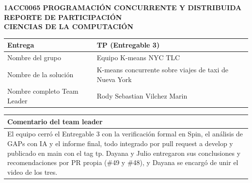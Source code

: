 \documentclass[11pt,a4paper]{article}
\newcommand{\nombreGrupo}{Equipo K-means NYC TLC}
\begin{document}
\begin{center}
\textbf{1ACC0065 PROGRAMACIÓN CONCURRENTE Y DISTRIBUIDA}\\[3pt]
\textbf{REPORTE DE PARTICIPACIÓN}\\[3pt]
\textbf{CIENCIAS DE LA COMPUTACIÓN}
\end{center}

\begin{tabularx}{\textwidth}{|L{5cm}|Y|}\hline
Entrega & TP (Entregable 3) \\\hline
Nombre del grupo & \nombreGrupo \\\hline
Nombre de la solución & K-means concurrente sobre viajes de taxi de Nueva York \\\hline
Nombre completo Team Leader & Rody Sebastian Vilchez Marin \\\hline
\end{tabularx}

\vspace{6pt}
\begin{tabularx}{\textwidth}{|Y|}\hline
\textbf{Comentario del team leader} \\\hline
El equipo cerró el Entregable 3 con la verificación formal en Spin, el análisis de GAPs con IA y el informe final, todo integrado por pull request a develop y publicado en main con el tag tp. Dayana y Julio entregaron sus conclusiones y recomendaciones por PR propia (\#49 y \#48), y Dayana se encargó de unir el video de los tres. \\\hline
\end{tabularx}
\end{document}
